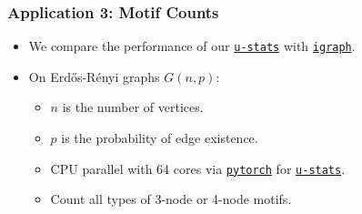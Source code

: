\documentclass[9pt]{beamer}
\theoremstyle{mystyle}
\theoremstyle{mystyletwo}
\newcommand{\libref}[2]{\href{#2}{\texttt{#1}}}
\newcommand{\torch}{\libref{pytorch}{https://pytorch.org/}}
\def\package{\libref{u-stats}{https://github.com/Amedar-Asterisk/U-Statistics-python}}
\newcommand{\igraph}{\libref{igraph}{https://igraph.org/}}
\begin{document}
\begin{frame}
    \frametitle{Application 3: Motif Counts}
    \begin{itemize}
    \setlength\itemsep{1.5em}
        \item We compare the performance of our \package{} with  \igraph{}.
        \item On Erdős-Rényi graphs $G(n, p)$:
            \begin{itemize}
            \setlength\itemsep{1.5em}
                \item $n$ is the number of vertices. 
                \item $p$ is the probability of edge existence. 
                \item CPU parallel with 64 cores via \torch{} for \package{}.
                \item Count all types of 3-node or 4-node motifs. 
            \end{itemize}
    \end{itemize}
\end{frame}
\end{document}
